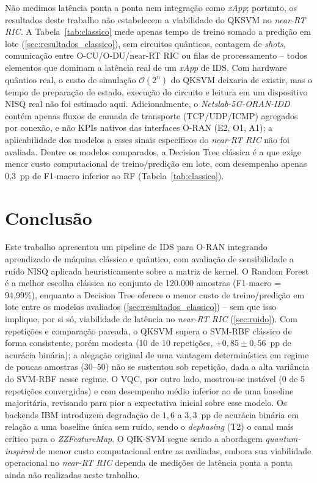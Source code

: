 \documentclass[12pt]{article}
\begin{document}
Não medimos latência ponta a ponta nem integração como \textit{xApp}; portanto, os resultados deste trabalho não estabelecem a viabilidade do QKSVM no \textit{near-RT RIC}. A Tabela~\ref{tab:classico} mede apenas tempo de treino somado a predição em lote (\autoref{sec:resultados_classico}), sem circuitos quânticos, contagem de \textit{shots}, comunicação entre O-CU/O-DU/near-RT RIC ou filas de processamento -- todos elementos que dominam a latência real de um \textit{xApp} de IDS. Com hardware quântico real, o custo de simulação $\mathcal{O}(2^n)$ do QKSVM deixaria de existir, mas o tempo de preparação de estado, execução do circuito e leitura em um dispositivo NISQ real não foi estimado aqui. Adicionalmente, o \textit{Netslab-5G-ORAN-IDD} contém apenas fluxos de camada de transporte (TCP/UDP/ICMP) agregados por conexão, e não KPIs nativos das interfaces O-RAN (E2, O1, A1); a aplicabilidade dos modelos a esses sinais específicos do \textit{near-RT RIC} não foi avaliada. Dentre os modelos comparados, a Decision Tree clássica é a que exige menor custo computacional de treino/predição em lote, com desempenho apenas 0,3~pp de F1-macro inferior ao RF (Tabela~\ref{tab:classico}).


\section{Conclusão}
\label{sec:conclusao}

Este trabalho apresentou um pipeline de IDS para O-RAN integrando aprendizado de máquina clássico e quântico, com avaliação de sensibilidade a ruído NISQ aplicada heuristicamente sobre a matriz de kernel. O Random Forest é a melhor escolha clássica no conjunto de 120.000 amostras (F1-macro = 94,99\%), enquanto a Decision Tree oferece o menor custo de treino/predição em lote entre os modelos avaliados (\autoref{sec:resultados_classico}) -- sem que isso implique, por si só, viabilidade de latência no \textit{near-RT RIC} (\autoref{sec:ruido}). Com repetições e comparação pareada, o QKSVM supera o SVM-RBF clássico de forma consistente, porém modesta (10 de 10 repetições, $+0{,}85 \pm 0{,}56$~pp de acurácia binária); a alegação original de uma vantagem determinística em regime de poucas amostras (30--50) não se sustentou sob repetição, dada a alta variância do SVM-RBF nesse regime. O VQC, por outro lado, mostrou-se instável (0 de 5 repetições convergidas) e com desempenho médio inferior ao de uma baseline majoritária, revisando para pior a expectativa inicial sobre esse modelo. Os backends IBM introduzem degradação de $1{,}6$ a $3{,}3$~pp de acurácia binária em relação a uma baseline única sem ruído, sendo o \textit{dephasing} (T2) o canal mais crítico para o \textit{ZZFeatureMap}. O QIK-SVM segue sendo a abordagem \textit{quantum-inspired} de menor custo computacional entre as avaliadas, embora sua viabilidade operacional no \textit{near-RT RIC} dependa de medições de latência ponta a ponta ainda não realizadas neste trabalho.
\end{document}
